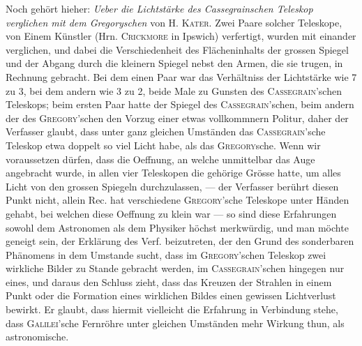 Noch gehört hieher: \emph{Ueber die Lichtstärke des Cassegrainschen Teleskop verglichen mit dem Gregoryschen} von H. \textsc{Kater}. Zwei Paare solcher Teleskope, von Einem Künstler (Hrn. \textsc{Crickmore} in Ipswich) verfertigt, wurden mit einander verglichen, und dabei die Verschiedenheit des Flächeninhalts der grossen Spiegel und der Abgang durch die kleinern Spiegel nebst den Armen, die sie trugen, in Rechnung gebracht. Bei dem einen Paar war das Verhältniss der Lichtstärke wie 7 zu 3, bei dem andern wie 3 zu 2, beide Male zu Gunsten des \textsc{Cassegrain}'schen Teleskops; beim ersten Paar hatte der Spiegel des \textsc{Cassegrain}'schen, beim andern der des \textsc{Gregory}'schen den Vorzug einer etwas vollkommnern Politur, daher der Verfasser glaubt, dass unter ganz gleichen Umständen das \textsc{Cassegrain}'sche Teleskop etwa doppelt so viel Licht habe, als das \textsc{Gregory}sche. Wenn wir voraussetzen dürfen, dass die Oeffnung, an welche unmittelbar das Auge angebracht wurde, in allen vier Teleskopen die gehörige Grösse hatte, um alles Licht von den grossen Spiegeln durchzulassen, — der Verfasser berührt diesen Punkt nicht, allein Rec. hat verschiedene \textsc{Gregory}'sche Teleskope unter Händen gehabt, bei welchen diese Oeffnung zu klein war — so sind diese Erfahrungen sowohl dem Astronomen als dem Physiker höchst merkwürdig, und man möchte geneigt sein, der Erklärung des Verf. beizutreten, der den Grund des sonderbaren Phänomens in dem Umstande sucht, dass im \textsc{Gregory}'schen Teleskop zwei wirkliche Bilder zu Stande gebracht werden, im \textsc{Cassegrain}'schen hingegen nur eines, und daraus den Schluss zieht, dass das Kreuzen der Strahlen in einem Punkt oder die Formation eines wirklichen Bildes einen gewissen Lichtverlust bewirkt. Er glaubt, dass hiermit vielleicht die Erfahrung in Verbindung stehe, dass \textsc{Galilei}'sche Fernröhre unter gleichen Umständen mehr Wirkung thun, als astronomische.
